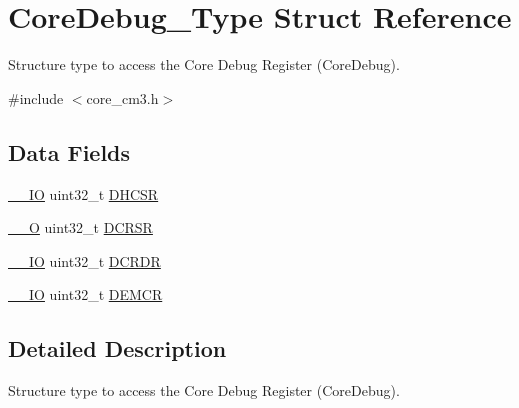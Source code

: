 \hypertarget{structCoreDebug__Type}{\section{Core\-Debug\-\_\-\-Type Struct Reference}
\label{structCoreDebug__Type}
}


Structure type to access the Core Debug Register (Core\-Debug).  




{\ttfamily \#include $<$core\-\_\-cm3.\-h$>$}

\subsection*{Data Fields}
\begin{DoxyCompactItemize}
\item 
\hyperlink{core__cm3_8h_aec43007d9998a0a0e01faede4133d6be}{\-\_\-\-\_\-\-I\-O} uint32\-\_\-t \hyperlink{structCoreDebug__Type_a25c14c022c73a725a1736e903431095d}{D\-H\-C\-S\-R}
\item 
\hyperlink{core__cm3_8h_a7e25d9380f9ef903923964322e71f2f6}{\-\_\-\-\_\-\-O} uint32\-\_\-t \hyperlink{structCoreDebug__Type_afefa84bce7497652353a1b76d405d983}{D\-C\-R\-S\-R}
\item 
\hyperlink{core__cm3_8h_aec43007d9998a0a0e01faede4133d6be}{\-\_\-\-\_\-\-I\-O} uint32\-\_\-t \hyperlink{structCoreDebug__Type_ab8f4bb076402b61f7be6308075a789c9}{D\-C\-R\-D\-R}
\item 
\hyperlink{core__cm3_8h_aec43007d9998a0a0e01faede4133d6be}{\-\_\-\-\_\-\-I\-O} uint32\-\_\-t \hyperlink{structCoreDebug__Type_a5cdd51dbe3ebb7041880714430edd52d}{D\-E\-M\-C\-R}
\end{DoxyCompactItemize}


\subsection{Detailed Description}
Structure type to access the Core Debug Register (Core\-Debug). 

